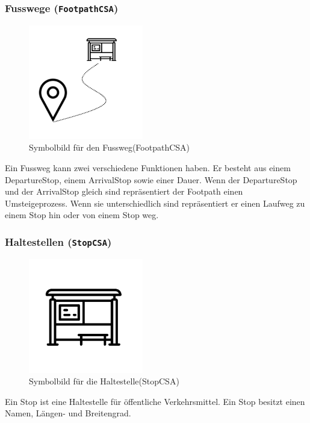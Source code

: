 \subsubsection{Fusswege (\texttt{FootpathCSA})}
\begin{figure}[htb]
	\centering
	\includegraphics[width=5cm]{img/footpath.png}
	\caption{Symbolbild für den Fussweg(FootpathCSA)}
	\label{fig:footpath}
\end{figure}
Ein Fussweg kann zwei verschiedene Funktionen haben. Er besteht aus einem DepartureStop, einem ArrivalStop sowie einer Dauer. Wenn der DepartureStop und der ArrivalStop gleich sind repräsentiert der Footpath einen Umsteigeprozess. Wenn sie unterschiedlich sind repräsentiert er einen Laufweg zu einem Stop hin oder von einem Stop weg.


\subsubsection{Haltestellen (\texttt{StopCSA})}
\begin{figure}[htb]
	\centering
	\includegraphics[width=5cm]{img/stop.png}
	\caption{Symbolbild für die Haltestelle(StopCSA)}
	\label{fig:stop}
\end{figure}
Ein Stop ist eine Haltestelle für öffentliche Verkehrsmittel. Ein Stop besitzt einen Namen, Längen- und Breitengrad. 

